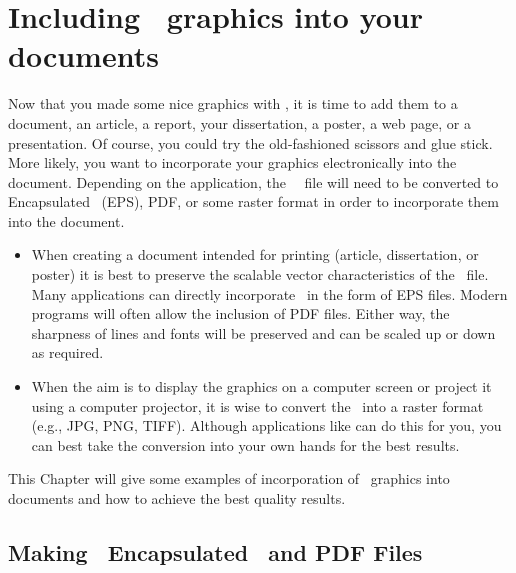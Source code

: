 %
%

\chapter{Including \gmt\ graphics into your documents}
\thispagestyle{headings}
\label{app:C}

Now that you made some nice graphics with \GMT, it is time to add them to a document, an article, a report, your dissertation, a poster, a web page, or a presentation. Of course, you could try the old-fashioned scissors and glue stick. More likely, you want to incorporate your graphics electronically into the document. Depending on the application, the \GMT\ \PS\ file will need to be converted to Encapsulated \PS\ (EPS), PDF, or some raster format in order to incorporate them into the document.
\begin{itemize}
\item When creating a document intended for printing (article, dissertation, or poster) it is best to preserve the scalable vector characteristics of the \PS\ file. Many applications can directly incorporate \PS\ in the form of EPS files. Modern programs will often allow the inclusion of PDF files. Either way, the sharpness of lines and fonts will be preserved and can be scaled up or down as required.
\item When the aim is to display the graphics on a computer screen or project it using a computer projector, it is wise to convert the \PS\ into a raster format (e.g., JPG, PNG, TIFF). Although applications like  can do this for you, you can best take the conversion into your own hands for the best results.
\end{itemize} 
This Chapter will give some examples of incorporation of \GMT\ graphics into documents and how to achieve the best quality results.

\section{Making \gmt\ Encapsulated \PS\ and PDF Files}

